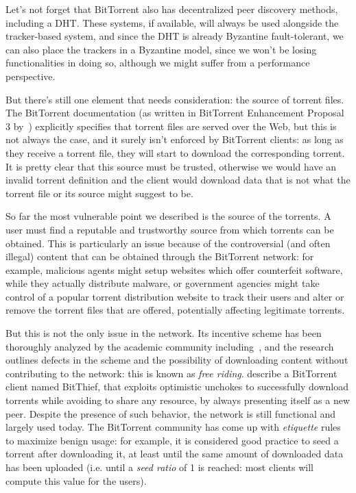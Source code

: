 \documentclass[mscthesis]{usiinfthesis}
\begin{document}
Let's not forget that BitTorrent also has decentralized peer discovery methods, including a DHT. These systems, if available, will always be used alongside the tracker-based system, and since the DHT is already Byzantine fault-tolerant, we can also place the trackers in a Byzantine model, since we won't be losing functionalities in doing so, although we might suffer from a performance perspective.

But there's still one element that needs consideration: the source of torrent files. The BitTorrent documentation (as written in BitTorrent Enhancement Proposal 3 by~\cite{bep:3}) explicitly specifies that torrent files are served over the Web, but this is not always the case, and it surely isn't enforced by BitTorrent clients: as long as they receive a torrent file, they will start to download the corresponding torrent. It is pretty clear that this source must be trusted, otherwise we would have an invalid torrent definition and the client would download data that is not what the torrent file or its source might suggest to be. %

So far the most vulnerable point we described is the source of the torrents. A user must find a reputable and trustworthy source from which torrents can be obtained. This is particularly an issue because of the controversial (and often illegal) content that can be obtained through the BitTorrent network: for example, malicious agents might setup websites which offer counterfeit software, while they actually distribute malware, or government agencies might take control of a popular torrent distribution website to track their users and alter or remove the torrent files that are offered, potentially affecting legitimate torrents.

But this is not the only issue in the network. Its incentive scheme has been thoroughly analyzed by the academic community including~\cite{Zghaibeh2008}, and the research outlines defects in the scheme and the possibility of downloading content without contributing to the network: this is known as \emph{free riding}. \cite{locher2006free} describe a BitTorrent client named BitThief, that exploits optimistic unchokes to successfully download torrents while avoiding to share any resource, by always presenting itself as a new peer. Despite the presence of such behavior, the network is still functional and largely used today. The BitTorrent community has come up with \textit{etiquette} rules to maximize benign usage: for example, it is considered good practice to seed a torrent after downloading it, at least until the same amount of downloaded data has been uploaded (i.e. until a \textit{seed ratio} of 1 is reached: most clients will compute this value for the users).
\end{document}
